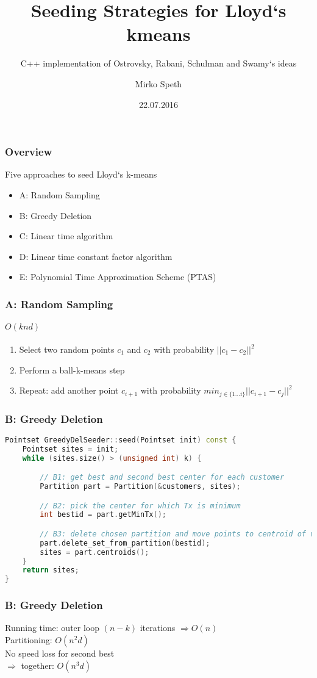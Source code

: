 \documentclass{beamer}
\title{Seeding Strategies for Lloyd`s kmeans}
\subtitle{C++ implementation of Ostrovsky, Rabani, Schulman and Swamy`s ideas}
\author{Mirko Speth}
\date{22.07.2016}
\begin{document}
  \frame{\titlepage}
  \begin{frame}
    \frametitle{Overview}
    Five approaches to seed Lloyd`s k-means
    \begin{itemize}
        \item{A: Random Sampling}
        \item{B: Greedy Deletion}
        \item{C: Linear time algorithm}
        \item{D: Linear time constant factor algorithm}
        \item{E: Polynomial Time Approximation Scheme (PTAS)}
    \end{itemize}
  \end{frame}
  
  
  
  
  \begin{frame}
    \frametitle{A: Random Sampling}
    \framesubtitle{$O(knd)$}
    \begin{enumerate}
        \item Select two random points $c_1$ and $c_2$ with probability $||c_1-c_2||^2$
        \item Perform a ball-k-means step
        \item Repeat: add another point $c_{i+1}$ with probability $min_{j\in\{1...i\}}{||c_{i+1}-c_j||^2}$
    \end{enumerate}
  \end{frame}
  
  
  \begin{frame}[fragile]
    \frametitle{B: Greedy Deletion}
\begin{lstlisting}[language=C++]
Pointset GreedyDelSeeder::seed(Pointset init) const {
	Pointset sites = init;
	while (sites.size() > (unsigned int) k) {

		// B1: get best and second best center for each customer
		Partition part = Partition(&customers, sites);

		// B2: pick the center for which Tx is minimum
		int bestid = part.getMinTx();

		// B3: delete chosen partition and move points to centroid of voronoi region
		part.delete_set_from_partition(bestid);
		sites = part.centroids();
	}
	return sites;
}
\end{lstlisting}
\end{frame}



  \begin{frame}
    \frametitle{B: Greedy Deletion}
    Running time: outer loop $(n-k)$ iterations $\Rightarrow O(n)$\\
    \newline
    Partitioning: $O(n^2d)$\\
    \newline
    No speed loss for second best\\
    \newline
    $\Rightarrow$ together: $O(n^3d)$
  \end{frame}
\end{document}
